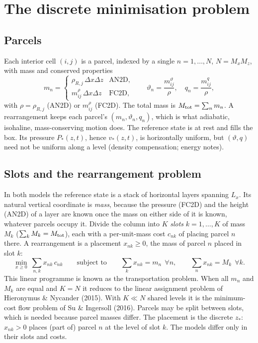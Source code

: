\documentclass[11pt,a4paper]{article}
\newcommand{\vt}{\vartheta}
\newcommand{\Mtot}{M_{\rm tot}}
\newcommand{\zs}{z_{*}}
\begin{document}
\section{The discrete minimisation problem}\label{sec:lorenz}
\subsection{Parcels}
Each interior cell $(i,j)$ is a parcel, indexed by a single $n=1,\dots,N$, $N=M_xM_z$, with mass and conserved properties
\begin{equation}
  m_n=\begin{cases}\rho_{R,j}\,\Delta x\Delta z & \text{AN2D},\\ m^\rho_{ij}\,\Delta x\Delta z & \text{FC2D},\end{cases}\qquad
  \vt_n=\frac{m^\vt_{ij}}{\rho},\quad q_n=\frac{m^q_{ij}}{\rho},
\end{equation}
with $\rho=\rho_{R,j}$ (AN2D) or $m^\rho_{ij}$ (FC2D). The total mass is $\Mtot=\sum_nm_n$. A rearrangement keeps each
parcel's $(m_n,\vt_n,q_n)$, which is what adiabatic, isohaline, mass-conserving motion does. The reference state is at rest
and fills the box. Its pressure $P_*(z,t)$, hence $v_*(z,t)$, is horizontally uniform, but $(\vt,q)$ need not be uniform
along a level (density compensation; energy notes).

\subsection{Slots and the rearrangement problem}\label{sec:rearrangement}
In both models the reference state is a stack of horizontal layers spanning $L_x$. Its natural vertical coordinate is
\emph{mass}, because the pressure (FC2D) and the height (AN2D) of a layer are known once the mass on either side of it is
known, whatever parcels occupy it. Divide the column into $K$ \emph{slots} $k=1,\dots,K$ of mass $M_k$
($\sum_kM_k=\Mtot$), each with a per-unit-mass cost $c_{nk}$ of placing parcel $n$ there. A rearrangement is a
placement $x_{nk}\ge0$, the mass of parcel $n$ placed in slot $k$:
\begin{equation}
  \min_{x\ge0}\ \sum_{n,k}x_{nk}\,c_{nk}\qquad\text{subject to}\qquad \sum_kx_{nk}=m_n\ \ \forall n,\qquad \sum_nx_{nk}=M_k\ \ \forall k .
  \label{eq:tp}
\end{equation}
This linear programme is known as the transportation problem. When all $m_n$ and $M_k$ are equal and $K=N$ it reduces to the
linear assignment problem of Hieronymus \& Nycander (2015). With $K\ll N$ shared levels it is the minimum-cost flow problem
of Su \& Ingersoll (2016). Parcels may be split between slots, which is needed because parcel masses differ.
The placement is the discrete $\zs$: $x_{nk}>0$ places (part of) parcel $n$ at the level of slot $k$.
The models differ only in their slots and costs.
\end{document}
